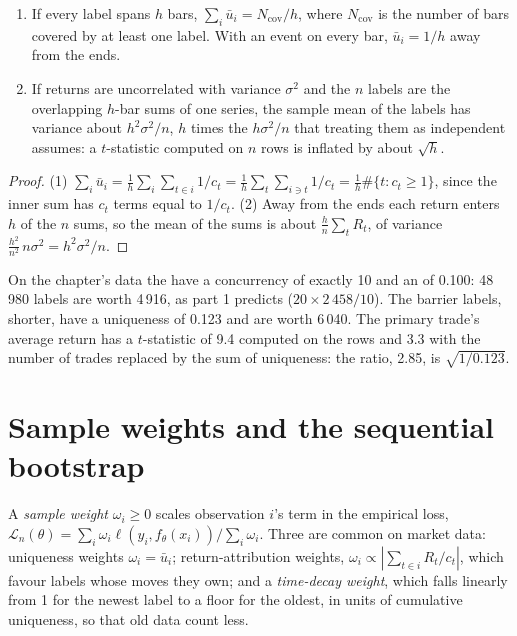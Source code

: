 \begin{proposition}\label{prop:ml:labels:sum}
\begin{enumerate}
\item If every label spans $h$ bars, $\sum_i\bar u_i = N_{\mathrm{cov}}/h$, where $N_{\mathrm{cov}}$ is the number of
bars covered by at least one label. With an event on every bar, $\bar u_i = 1/h$ away from the ends.
\item If returns are uncorrelated with variance $\sigma^2$ and the $n$ labels are the overlapping $h$-bar sums of one
series, the sample mean of the labels has variance about $h^2\sigma^2/n$, $h$ times the $h\sigma^2/n$ that treating them
as independent assumes: a $t$-statistic computed on $n$ rows is inflated by about $\sqrt h$.
\end{enumerate}
\end{proposition}

\begin{proof}
(1) $\sum_i\bar u_i = \frac1h\sum_i\sum_{t\in i}1/c_t = \frac1h\sum_t\sum_{i\ni t}1/c_t = \frac1h\#\{t: c_t\ge1\}$,
since the inner sum has $c_t$ terms equal to $1/c_t$. (2) Away from the ends each return enters $h$ of the $n$ sums, so
the mean of the sums is about $\frac hn\sum_tR_t$, of variance $\frac{h^2}{n^2}\,n\sigma^2 = h^2\sigma^2/n$.
\end{proof}

On the chapter's data the  have a concurrency of exactly 10 and an  of 0.100:
48\,980 labels are worth 4\,916, as part 1 predicts ($20\times2\,458/10$). The barrier labels, shorter, have a uniqueness
of 0.123 and are worth 6\,040. The primary trade's average return has a $t$-statistic of 9.4 computed on the rows and
3.3 with the number of trades replaced by the sum of uniqueness: the ratio, 2.85, is $\sqrt{1/0.123}$.

\section{Sample weights and the sequential bootstrap}

\begin{definition}\label{def:ml:targets-labels-and-sample-weights:weights}
A \emph{sample weight} $\omega_i\ge0$ scales observation $i$'s term in the empirical loss,
$\mathcal L_n(\theta) = \sum_i\omega_i\ell(y_i, f_\theta(x_i))/\sum_i\omega_i$. Three are common on market data:
uniqueness weights $\omega_i = \bar u_i$; return-attribution weights, $\omega_i\propto|\sum_{t\in i}R_t/c_t|$, which
favour labels whose moves they own; and a \emph{time-decay weight}, which falls linearly from 1
for the newest label to a floor for the oldest, in units of cumulative uniqueness, so that old data count less.
\end{definition}

